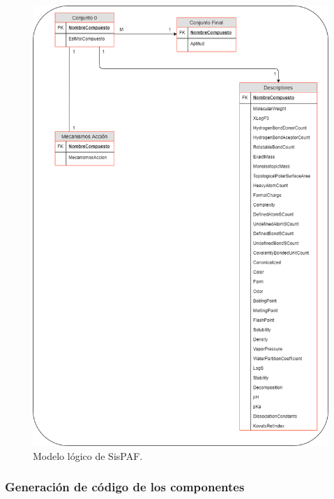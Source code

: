 \begin{figure}[H]
    \centering
    \includegraphics[scale=0.40]{Capitulo4/Documentos/imagenes_generacion/modeloDatosLogico.png}
    \caption{Modelo lógico de SisPAF.}
    \label{Modelo_logico_de_SisPAF_1}
\end{figure}

\subsubsection{Generación de código de los componentes}
